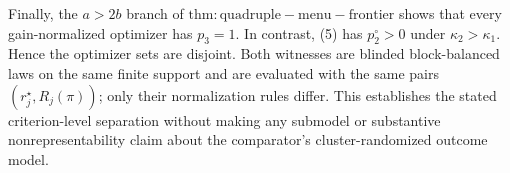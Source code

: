 Finally, the \(a>2b\) branch of \(\mathrm{thm:quadruple-menu-frontier}\) shows that every gain-normalized optimizer has \(p_3=1\). In contrast, (5) has \(p_2^\circ>0\) under \(\kappa_2>\kappa_1\). Hence the optimizer sets are disjoint. Both witnesses are blinded block-balanced laws on the same finite support and are evaluated with the same pairs \((r_j^\star,R_j(\pi))\); only their normalization rules differ. This establishes the stated criterion-level separation without making any submodel or substantive nonrepresentability claim about the comparator's cluster-randomized outcome model.